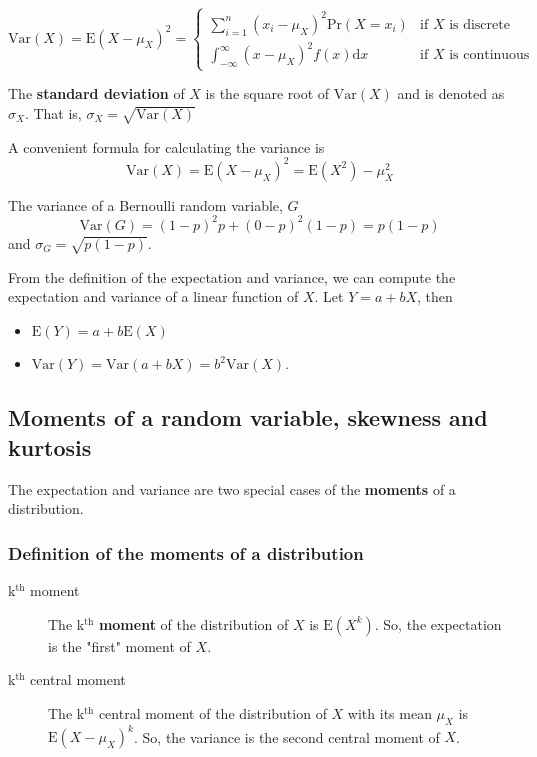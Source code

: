 \documentclass[a4paper,11pt]{article}
\begin{document}
\begin{equation*}
\mathrm{Var}(X) = \mathrm{E}(X-\mu_X)^{2}=
\begin{cases}
\sum_{i=1}^n (x_i - \mu_X)^{2}\mathrm{Pr}(X = x_i) & \text{if } X \text{ is discrete} \\
\int_{-\infty}^{\infty} (x - \mu_X)^{2}f(x)\mathrm{d} x  & \text{if } X \text{ is continuous}
\end{cases}
\end{equation*}

The \textbf{standard deviation} of \(X\) is the square root of
\(\mathrm{Var}(X)\) and is denoted as \(\sigma_{X}\). That is,
\(\sigma_{X} = \sqrt{\mathrm{Var}(X)}\)

A convenient formula for calculating the variance is
\[ \mathrm{Var}(X) = \mathrm{E}(X - \mu_X)^{2} = \mathrm{E}(X^{2}) - \mu_X^{2} \]

The variance of a Bernoulli random variable, \(G\)
\[ \mathrm{Var}(G) = (1-p)^{2}p + (0-p)^{2}(1-p) = p(1-p) \] and \(\sigma_{G} =
\sqrt{p(1-p)}\).

From the definition of the expectation and variance, we can compute
the expectation and variance of a linear function of \(X\). Let \(Y = a +
bX\), then
\begin{itemize}
\item \(\mathrm{E}(Y) = a + b\mathrm{E}(X)\)
\item \(\mathrm{Var}(Y) = \mathrm{Var}(a + b X) = b^{2} \mathrm{Var}(X)\).
\end{itemize}


\subsection{Moments of a random variable, skewness and kurtosis}
\label{sec:orgdc821ad}

The expectation and variance are two special cases of the \textbf{moments} of
a distribution.

\subsubsection*{Definition of the moments of a distribution}
\label{sec:org8b21720}

\begin{description}
\item[{k\(^{\text{th}}\) moment}] The k\(^{\text{th}}\) \textbf{moment} of the distribution of \(X\) is
\(\mathrm{E}(X^{k})\). So, the expectation is the "first"
moment of \(X\).

\item[{k\(^{\text{th}}\) central moment}] The k\(^{\text{th}}\) central moment of the distribution
of \(X\) with its mean \(\mu_X\) is \(\mathrm{E}(X - \mu_X)^{k}\). So, the
variance is the second central moment of \(X\).
\end{description}
\end{document}
